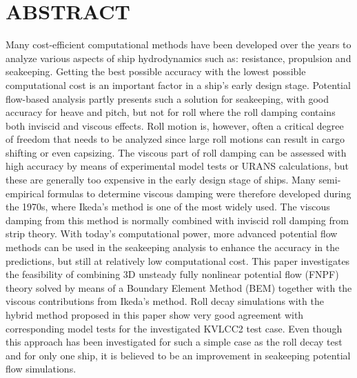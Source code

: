 \section*{ABSTRACT}\label{abstract}

Many cost-efficient computational methods have been developed over the
years to analyze various aspects of ship hydrodynamics such as:
resistance, propulsion and seakeeping. Getting the best possible
accuracy with the lowest possible computational cost is an important
factor in a ship's early design stage. Potential flow-based analysis
partly presents such a solution for seakeeping, with good accuracy for
heave and pitch, but not for roll where the roll damping contains both
inviscid and viscous effects. Roll motion is, however, often a critical
degree of freedom that needs to be analyzed since large roll motions can
result in cargo shifting or even capsizing. The viscous part of roll
damping can be assessed with high accuracy by means of experimental
model tests or URANS calculations, but these are generally too expensive
in the early design stage of ships. Many semi-empirical formulas to
determine viscous damping were therefore developed during the 1970s,
where Ikeda's method is one of the most widely used. The viscous damping
from this method is normally combined with inviscid roll damping from
strip theory. With today's computational power, more advanced potential
flow methods can be used in the seakeeping analysis to enhance the
accuracy in the predictions, but still at relatively low computational
cost. This paper investigates the feasibility of combining 3D unsteady
fully nonlinear potential flow (FNPF) theory solved by means of a
Boundary Element Method (BEM) together with the viscous contributions
from Ikeda's method. Roll decay simulations with the hybrid method
proposed in this paper show very good agreement with corresponding model
tests for the investigated KVLCC2 test case. Even though this approach
has been investigated for such a simple case as the roll decay test and
for only one ship, it is believed to be an improvement in seakeeping
potential flow simulations.

    